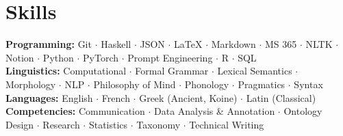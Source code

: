 \documentclass[10pt,letterpaper]{article}
\begin{document}
\section*{Skills}

\noindent\textbf{Programming:} Git $\cdot$ Haskell $\cdot$ JSON $\cdot$ LaTeX $\cdot$ Markdown $\cdot$ MS 365 $\cdot$ NLTK $\cdot$ Notion $\cdot$ Python $\cdot$ PyTorch $\cdot$ Prompt Engineering $\cdot$ R $\cdot$ SQL\\[0.4em]
\textbf{Linguistics:} Computational $\cdot$ Formal Grammar $\cdot$ Lexical Semantics $\cdot$ Morphology $\cdot$ NLP $\cdot$ Philosophy of Mind $\cdot$ Phonology $\cdot$ Pragmatics $\cdot$ Syntax\\[0.4em]
\textbf{Languages:} English $\cdot$ French $\cdot$ Greek (Ancient, Koine) $\cdot$ Latin (Classical)\\[0.4em]
\textbf{Competencies:} Communication $\cdot$ Data Analysis \& Annotation $\cdot$ Ontology Design $\cdot$ Research $\cdot$ Statistics $\cdot$ Taxonomy $\cdot$ Technical Writing
\end{document}

